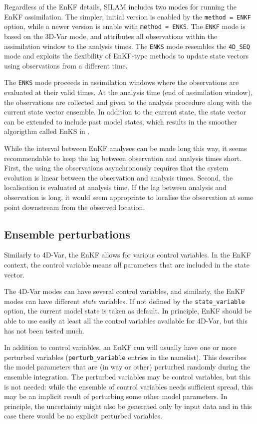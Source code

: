 \documentclass[a4paper]{article}
\begin{document}
Regardless of the EnKF details, SILAM includes two modes for running the EnKF
assimilation. The simpler, initial version is enabled by the \verb|method = ENKF| option,
while a newer version is enable with \verb|method = ENKS|. The \verb|ENKF| mode is based
on the 3D-Var mode, and attributes all observations within the assimilation window to the
analysis times. The \verb|ENKS| mode resembles the \verb|4D_SEQ| mode and exploits the
flexibility of EnKF-type methods to update state vectors using observations from a different time.

The \verb|ENKS| mode proceeds in assimilation windows where the observations are evaluated
at their valid times. At the analysis time (end of assimilation window), the observations
are collected and given to the analysis procedure along with the current state vector
ensemble. In addition to the current state, the state vector can be extended to include
past model states, which results in the smoother algorigthm called EnKS in
\cite{evensen2009data}.

While the interval between EnKF analyses can be made long this way, it seems recommendable
to keep the lag between observation and analysis times short. First, the using the
observations asynchronously requires that the system evolution is linear between the
observation and analysis times. Second, the localisation is evaluated at analysis time. If
the lag between analysis and observation is long, it would seem appropriate to localise
the observation at some point downstream from the observed location.

\subsection{Ensemble perturbations}

Similarly to 4D-Var, the EnKF allows for various control variables. In the EnKF context,
the control variable means all parameters that are included in the state vector. 

The 4D-Var modes can have several control variables, and similarly, the EnKF modes can
have different \emph{state} variables. If not defined by the \verb|state_variable| option,
the current model state is taken as default.  In principle, EnKF should be able to use
easily at least all the control variables available for 4D-Var, but this has not been
tested much.

In addition to control variables, an EnKF run will usually have one or more perturbed
variables (\verb|perturb_variable| entries in the namelist). This describes the model
parameters that are (in way or other) perturbed randomly during the ensemble
integration. The perturbed variables may be control variables, but this is not needed:
while the ensemble of control variables needs sufficient spread, this may be an implicit
result of perturbing some other model parameters. In principle, the uncertainty might also
be generated only by input data and in this case there would be no explicit perturbed
variables.
\end{document}
